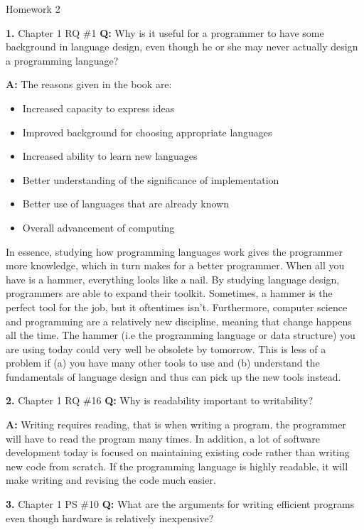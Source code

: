 \documentclass[letterpaper, 11pt]{article}
\newcommand{\hwnumbersec}[3]{\medskip \noindent\textbf{#1.} Chapter #2 #3
\newline\noindent\textbf{Q:}}
\newcommand{\A}{\noindent\textbf{A:} }
\begin{document}
\begin{center}
	{\LARGE Homework 2}\\
\end{center}

\hwnumbersec{1}{1}{RQ \#1}
Why is it useful for a programmer to have some background in language design,
even though he or she may never actually design a programming language?

\A The reasons given in the book are: 
\begin{itemize}
\item Increased capacity to express ideas
\item Improved background for choosing appropriate languages
\item Increased ability to learn new languages
\item Better understanding of the significance of implementation
\item Better use of languages that are already known
\item Overall advancement of computing
\end{itemize}

In essence, studying how programming languages work gives the programmer more
knowledge, which in turn makes for a better programmer. When all you have is a
hammer, everything looks like a nail. By studying language design, programmers
are able to expand their toolkit. Sometimes, a hammer is the perfect tool for
the job, but it oftentimes isn't. Furthermore, computer science and programming
are a relatively new discipline, meaning that change happens all the time. The
hammer (i.e the programming language or data structure) you are using today
could very well be obsolete by tomorrow. This is less of a problem if (a) you
have many other tools to use and (b) understand the fundamentals of language
design and thus can pick up the new tools instead.  

\hwnumbersec{2}{1}{RQ \#16}
Why is readability important to writability?

\A Writing requires reading, that is when writing a program, the programmer will
have to read the program many times. In addition, a lot of software development
today is focused on maintaining existing code rather than writing new code from
scratch. If the programming language is highly readable, it will make writing
and revising the code much easier.  

\hwnumbersec{3}{1}{PS \#10}
What are the arguments for writing efficient programs even though hardware is
relatively inexpensive?
\end{document}
